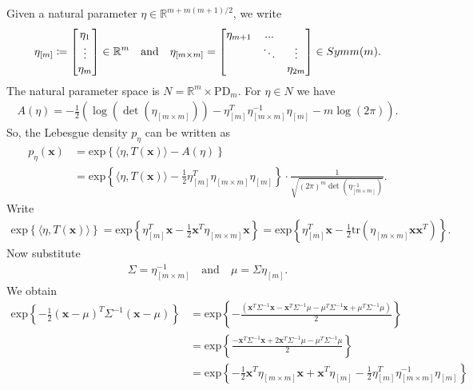 \begin{eg}
  Given a natural parameter \( \eta \in \mathbb R^{m + m(m+1)/2} \), we write 
  \begin{align*}
    \eta_{[m]} \coloneqq \begin{bmatrix}
      \eta_1 \\ \vdots \\ \eta_m
    \end{bmatrix} \in \mathbb R^m
    \quad \text{and} \quad
    \eta_{[m \times m]} = \begin{bmatrix}
      \eta_{m+1}  & ... &  \\ 
      & \ddots & \vdots \\ 
      & & \eta_{2m}
    \end{bmatrix} \in \mathbb \mathrm{Symm}(m).
  \end{align*}
  The natural parameter space is \( N = \mathbb R^m \times \mathrm{PD}_m \). For \( \eta \in N \) we have 
  \begin{align*}
    A(\eta) = -\frac{1}{2}\left( \log\left( \det(\eta_{[m \times m]}) \right) - \eta_{[m]}^T\eta_{[m \times m]}^{-1}\eta_{[m]} - m \log(2 \pi) \right).
  \end{align*}
  So, the Lebesgue density \( p_\eta \) can be written as 
  \begin{align*}
    p_\eta(\mathbf x) &= \mathrm{exp}\left\{\langle \eta, T(\mathbf x) \rangle - A(\eta) \right\}\\ &= \mathrm{exp}\left\{\langle \eta, T(\mathbf x) \rangle - \frac{1}{2}\eta_{[m]}^T\eta_{[m \times m]}\eta_{[m]} \right\} \cdot \frac{1}{\sqrt{(2\pi)^m\det\left(\eta_{[m \times m]}^{-1}\right)}}.
  \end{align*}
  Write 
  \begin{align*}
    \mathrm{exp}\left\{\langle \eta, T(\mathbf x) \rangle \right\} = \mathrm{exp}\left\{ \eta_{[m]}^T\mathbf x - \frac{1}{2}\mathbf x^T\eta_{[m \times m]}\mathbf x \right\} = \mathrm{exp}\left\{  \eta_{[m]}^T\mathbf x - \frac{1}{2} \mathrm{tr}\left( \eta_{[m \times m]} \mathbf x \mathbf x^T \right)\right\}.
  \end{align*}
  Now substitute 
  \begin{align*}
    \Sigma = \eta_{[m \times m]}^{-1} \quad \text{and} \quad \mu = \Sigma \eta_{[m]}.
  \end{align*}
  We obtain 
  \begin{align*}
    \mathrm{exp}\left\{ -\frac{1}{2} (\mathbf x - \mu)^T\Sigma^{-1}(\mathbf x - \mu) \right\} &= \mathrm{exp}\left\{ -\frac{\left( 
      \mathbf x^T \Sigma^{-1} \mathbf x - \mathbf x^T \Sigma^{-1}\mu - \mu^T \Sigma^{-1} \mathbf x +  \mu^T \Sigma^{-1} \mu 
     \right)}{2} \right\} \\
     &= \mathrm{exp}\left\{ 
      \frac{-\mathbf x^T \Sigma^{-1}\mathbf x + 2 \mathbf x^T \Sigma^{-1}\mu - \mu^T \Sigma^{-1} \mu}{2}
      \right\} \\
      &= \mathrm{exp}\left\{
        -\frac{1}{2}\mathbf x^T \eta_{[m \times m]}\mathbf x + \mathbf x^T \eta_{[m]} - \frac{1}{2}\eta_{[m]}^T\eta_{[m \times m]}^{-1}\eta_{[m]}
      \right\}
  \end{align*}
\end{eg}

